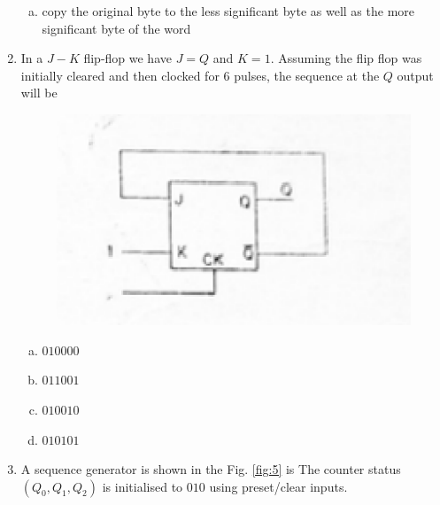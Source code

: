 \documentclass[journal,12pt,twocolumn]{IEEEtran}
\begin{document}
\begin{enumerate}
\begin{enumerate}[(a)]
\item copy the original byte to the less significant byte as well as the more significant byte of the word

\end{enumerate}

\item In a $J-K$ flip-flop we have $J=Q$ and $K=1$. Assuming the flip flop was initially cleared and then clocked for $6$ pulses, the sequence at the $Q$ output will be

\begin{figure}

\centering

\includegraphics[width=\columnwidth]{./figs/4.eps}

\caption{}

\label{fig:4}

\end{figure} 

 
 
\begin{enumerate}[(a)]

\item $
010000
$

\item $
011001
$

\item $
010010
$

\item $
010101
$

\end{enumerate}

\item A sequence generator is shown in the Fig. \ref{fig:5} is 
The counter status $(Q_0,Q_1,Q_2)$ is initialised to $010$ using preset/clear inputs.


\end{enumerate}
\end{document}
